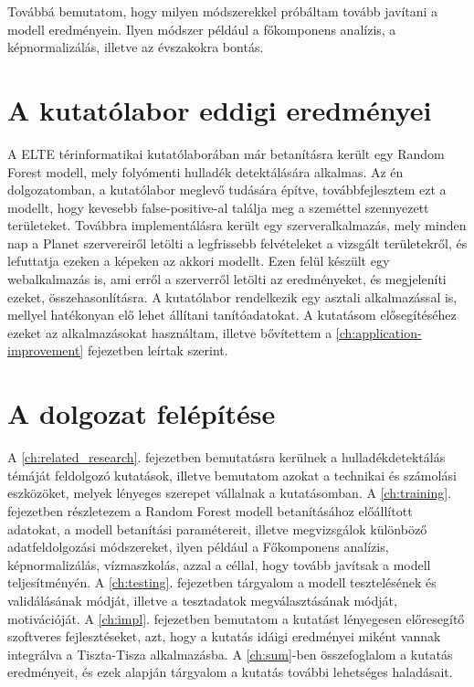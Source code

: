 Továbbá bemutatom, hogy milyen módszerekkel próbáltam tovább javítani a modell eredményein. Ilyen módszer például a főkomponens analízis, a képnormalizálás, illetve az évszakokra bontás.

\section{A kutatólabor eddigi eredményei}

A ELTE térinformatikai kutatólaborában már betanításra került egy Random Forest modell, mely folyómenti hulladék detektálására alkalmas. Az én dolgozatomban, a kutatólabor meglevő tudására építve, továbbfejlesztem ezt a modellt, hogy kevesebb false-positive-al találja meg a szeméttel szennyezett területeket. Továbbra implementálásra került egy szerveralkalmazás, mely minden nap a Planet szervereiről letölti a legfrissebb felvételeket a vizsgált területekről, és lefuttatja ezeken a képeken az akkori modellt. Ezen felül készült egy webalkalmazás is, ami erről a szerverről letölti az eredményeket, és megjeleníti ezeket, összehasonlításra. A kutatólabor rendelkezik egy asztali alkalmazással is, mellyel hatékonyan elő lehet állítani tanítóadatokat. A kutatásom elősegítéséhez ezeket az alkalmazásokat használtam, illetve bővítettem a \ref{ch:application-improvement} fejezetben leírtak szerint.


\section{A dolgozat felépítése}
A \ref{ch:related_research}. fejezetben bemutatásra kerülnek a hulladékdetektálás témáját feldolgozó kutatások, illetve bemutatom azokat a technikai és számolási eszközöket, melyek lényeges szerepet vállalnak a kutatásomban.
A \ref{ch:training}. fejezetben részletezem a Random Forest modell betanításához előállított adatokat, a modell betanítási paramétereit, illetve megvizsgálok különböző adatfeldolgozási módszereket, ilyen például a Főkomponens analízis, képnormalizálás, vízmaszkolás, azzal a céllal, hogy tovább javítsak a modell teljesítményén. A \ref{ch:testing}. fejezetben tárgyalom a modell tesztelésének és validálásának módját, illetve a tesztadatok megválasztásának módját, motivációját. A \ref{ch:impl}. fejezetben bemutatom a kutatást lényegesen előresegítő szoftveres fejlesztéseket, azt, hogy a kutatás idáigi eredményei miként vannak integrálva a Tiszta-Tisza alkalmazásba. A \ref{ch:sum}-ben összefoglalom a kutatás eredményeit, és ezek alapján tárgyalom a kutatás további lehetséges haladásait. 